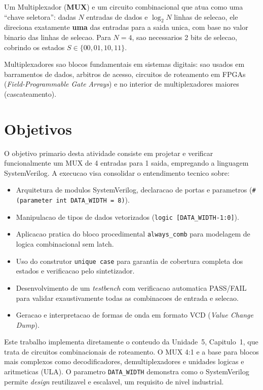 \documentclass[12pt, a4paper]{article}
\begin{document}
\begin{conceitobox}
Um Multiplexador (\textbf{MUX}) e um circuito combinacional que atua como uma
``chave seletora'': dadas $N$ entradas de dados e $\log_2 N$ linhas de selecao,
ele direciona exatamente \textbf{uma} das entradas para a saida unica, com base
no valor binario das linhas de selecao. Para $N=4$, sao necessarios 2 bits de
selecao, cobrindo os estados $S \in \{00, 01, 10, 11\}$.

\medskip
Multiplexadores sao blocos fundamentais em sistemas digitais: sao usados em
barramentos de dados, arbitros de acesso, circuitos de roteamento em FPGAs
(\textit{Field-Programmable Gate Arrays}) e no interior de multiplexadores
maiores (cascateamento).
\end{conceitobox}

\section{Objetivos}

O objetivo primario desta atividade consiste em projetar e verificar funcionalmente
um MUX de 4 entradas para 1 saida, empregando a linguagem SystemVerilog. A execucao
visa consolidar o entendimento tecnico sobre:

\begin{itemize}
  \item Arquitetura de modulos SystemVerilog, declaracao de portas e parametros
        (\texttt{\#(parameter int DATA\_WIDTH = 8)}).
  \item Manipulacao de tipos de dados vetorizados (\texttt{logic [DATA\_WIDTH-1:0]}).
  \item Aplicacao pratica do bloco procedimental \texttt{always\_comb} para modelagem
        de logica combinacional sem latch.
  \item Uso do construtor \texttt{unique case} para garantia de cobertura completa
        dos estados e verificacao pelo sintetizador.
  \item Desenvolvimento de um \textit{testbench} com verificacao automatica PASS/FAIL
        para validar exaustivamente todas as combinacoes de entrada e selecao.
  \item Geracao e interpretacao de formas de onda em formato VCD
        (\textit{Value Change Dump}).
\end{itemize}

\begin{unidadebox}
Este trabalho implementa diretamente o conteudo da Unidade~5, Capitulo~1, que
trata de circuitos combinacionais de roteamento. O MUX 4:1 e a base para blocos
mais complexos como decodificadores, demultiplexadores e unidades logicas e
aritmeticas (ULA). O parametro \texttt{DATA\_WIDTH} demonstra como o SystemVerilog
permite \textit{design} reutilizavel e escalavel, um requisito de nivel industrial.
\end{unidadebox}
\end{document}
